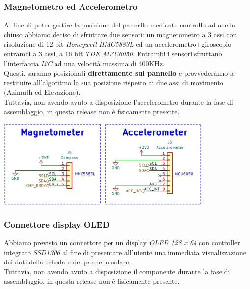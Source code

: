 \hypertarget{magnetometro-ed-accelerometro}{%
\subsubsection{\texorpdfstring{\hfill\break
Magnetometro ed Accelerometro\\
}{ Magnetometro ed Accelerometro }}\label{magnetometro-ed-accelerometro}}

Al fine di poter gestire la posizione del pannello mediante controllo ad
anello chiuso abbiamo deciso di sfruttare due sensori: un magnetometro a
3 assi con risoluzione di 12 bit \emph{Honeywell} \emph{HMC5883L} ed un
accelerometro+giroscopio entrambi a 3 assi, a 16 bit \emph{TDK}
\emph{MPU6050}. Entrambi i sensori sfruttano l'interfaccia \emph{I2C} 
ad una velocità massima di 400KHz.\\
Questi, saranno posizionati \textbf{direttamente sul pannello} e
provvederanno a restituire all'algoritmo la sua posizione
rispetto ai due assi di movimento (Azimuth ed Elevazione).\\
Tuttavia, non avendo avuto a disposizione l'accelerometro durante la
fase di assemblaggio, in questa release non è fisicamente presente.

\begin{center}
\includegraphics[width=0.8\textwidth]{figures/image31.png}
\captionsetup{type=figure}
\end{center}

\hypertarget{connettore-display-oled}{%
\subsubsection{\texorpdfstring{Connettore display OLED\\
}{Connettore display OLED }}\label{connettore-display-oled}}

Abbiamo previsto un connettore per un display \emph{OLED 128 x 64} con
controller integrato \emph{SSD1306} al fine di presentare all'utente una
immediata visualizzazione dei dati della scheda e del pannello solare.\\
Tuttavia, non avendo avuto a disposizione il componente durante la fase
di assemblaggio, in questa release non è fisicamente presente.

